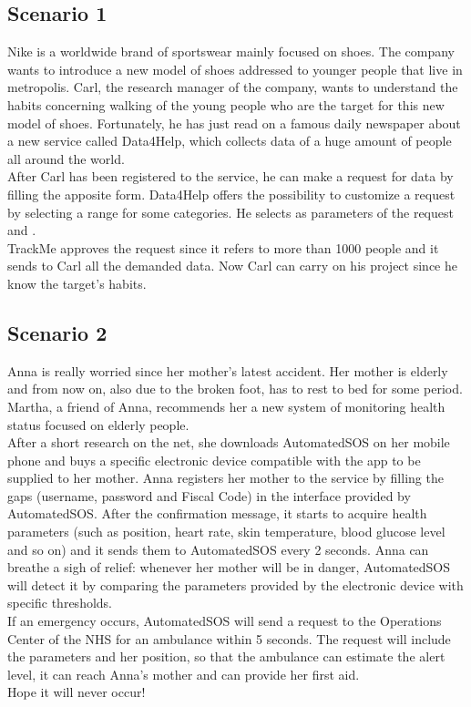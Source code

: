     \subsection{Scenario 1}
    Nike is a worldwide brand of sportswear mainly focused on shoes. The company wants to introduce a new model of shoes addressed to younger people that live in metropolis. Carl, the research manager of the company, wants to understand the habits concerning walking of the young people who are the target for this new model of shoes.
    Fortunately, he has just read on a famous daily newspaper about a new service called Data4Help, which collects data of a huge amount of people all around the world. \\
    After Carl has been registered to the service, he can make a request for data by filling the apposite form. Data4Help offers the possibility to customize a request by selecting a range for some categories. He selects as parameters of the request  and . \\
    TrackMe approves the request since it refers to more than 1000 people and it sends to Carl all the demanded data.
    Now Carl can carry on his project since he know the target's habits.

    \subsection{Scenario 2}
    Anna is really worried since her mother's latest accident. Her mother is elderly and from now on, also due to the broken foot, has to rest to bed for some period. Martha, a friend of Anna, recommends her a new system of monitoring health status focused on elderly people. \\ 
    After a short research on the net, she downloads AutomatedSOS on her mobile phone and buys a specific electronic device compatible with the app to be supplied to her mother. 
    Anna registers her mother to the service by filling the gaps (username, password and Fiscal Code) in the interface provided by AutomatedSOS.
    After the confirmation message, it starts to acquire health parameters (such as position, heart rate, skin temperature, blood glucose level and so on) and it sends them to AutomatedSOS every 2 seconds.
    Anna can breathe a sigh of relief: whenever her mother will be in danger, AutomatedSOS will detect it by comparing the parameters provided by the electronic device with specific thresholds. \\ 
    If an emergency occurs, AutomatedSOS will send a request to the Operations Center of the NHS for an ambulance within 5 seconds. The request will include the parameters and her position, so that the ambulance can estimate the alert level, it can reach Anna’s mother and can provide her first aid. \\
    Hope it will never occur!


